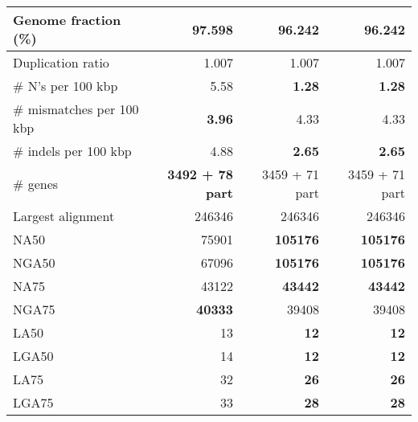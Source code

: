 \documentclass[12pt,a4paper]{article}
\begin{document}
\begin{table}[ht]
\begin{center}
\begin{tabular}{|l*{3}{|r}|}
Genome fraction (\%) & {\bf 97.598} & 96.242 & 96.242 \\ \hline
Duplication ratio & 1.007 & 1.007 & 1.007 \\ \hline
\# N's per 100 kbp & 5.58 & {\bf 1.28} & {\bf 1.28} \\ \hline
\# mismatches per 100 kbp & {\bf 3.96} & 4.33 & 4.33 \\ \hline
\# indels per 100 kbp & 4.88 & {\bf 2.65} & {\bf 2.65} \\ \hline
\# genes & {\bf 3492 + 78 part} & 3459 + 71 part & 3459 + 71 part \\ \hline
Largest alignment & 246346 & 246346 & 246346 \\ \hline
NA50 & 75901 & {\bf 105176} & {\bf 105176} \\ \hline
NGA50 & 67096 & {\bf 105176} & {\bf 105176} \\ \hline
NA75 & 43122 & {\bf 43442} & {\bf 43442} \\ \hline
NGA75 & {\bf 40333} & 39408 & 39408 \\ \hline
LA50 & 13 & {\bf 12} & {\bf 12} \\ \hline
LGA50 & 14 & {\bf 12} & {\bf 12} \\ \hline
LA75 & 32 & {\bf 26} & {\bf 26} \\ \hline
LGA75 & 33 & {\bf 28} & {\bf 28} \\ \hline
\end{tabular}
\end{center}
\end{table}
\end{document}
